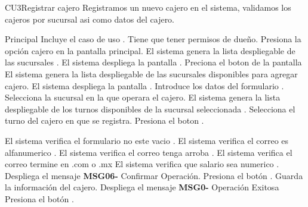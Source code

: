 \begin{UseCase}{CU3}{Registrar cajero}{
		Registramos un nuevo cajero en el sistema, validamos los cajeros por sucursal asi como datos del cajero. 	
	}
\end{UseCase}
\begin{UCtrayectoria}{Principal}
	\UCpaso Incluye el caso de uso .
	\UCpaso [\UCactor] Tiene que tener permisos de dueño.
	\UCpaso [\UCactor] Presiona la opción cajero en la pantalla principal.
	\UCpaso El sistema genera la lista despliegable de las sucursales .
	\UCpaso El sistema despliega la pantalla .
	\UCpaso [\UCactor]Preciona el boton   de la pantalla 
	\UCpaso El sistema genera la lista despliegable de las sucursales disponibles para agregar cajero.
	\UCpaso El sistema despliega la pantalla .
	\UCpaso [\UCactor] Introduce los datos del formulario  .
	\UCpaso [\UCactor] Selecciona la sucursal en la que operara el cajero.
	\UCpaso El sistema genera la lista despliegable de los  turnos disponibles de la sucursal seleccionada .
	\UCpaso [\UCactor] Selecciona el turno del cajero en que se registra.
	\UCpaso [\UCactor]Presiona el boton  .
	
	\UCpaso El sistema verifica el formulario no este vacio .
	\UCpaso	El sistema verifica el correo es alfanumerico .
	\UCpaso El sistema verifica el correo tenga arroba .
	\UCpaso El sistema verifica el correo termine en .com o .mx 
	\UCpaso El sistema verifica que salario sea numerico .%
	\UCpaso Despliega el mensaje {\bf MSG06-} {Confirmar Operación}. 
	\UCpaso [\UCactor] Presiona el botón  .
	\UCpaso Guarda la información del cajero.
	\UCpaso Despliega el mensaje {\bf MSG0-} {Operación Exitosa}
	\UCpaso [\UCactor] Presiona el botón .
	
	
	
\end{UCtrayectoria}

